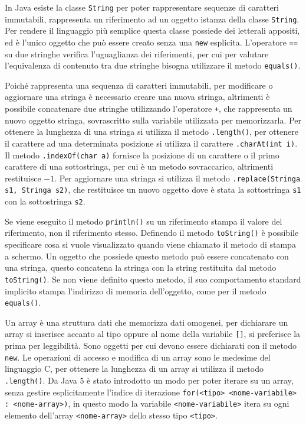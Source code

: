 \documentclass{article}
\numberwithin{equation}{subsection}
\begin{document}
In Java esiste la classe \verb|String| per poter rappresentare sequenze di caratteri immutabili, rappresenta un riferimento ad un oggetto istanza della classe \verb|String|. 
Per rendere il linguaggio più semplice questa classe possiede dei letterali appositi, ed è l'unico oggetto che può essere creato senza una \verb|new| esplicita. L'operatore 
\verb|==| su due stringhe verifica l'uguaglianza dei riferimenti, per cui per valutare l'equivalenza di contenuto tra due stringhe bisogna utilizzare il metodo \verb|equals()|. 

Poiché rappresenta una sequenza di caratteri immutabili, per modificare o aggiornare una stringa è necessario creare una nuova stringa, altrimenti è possibile concatenare due 
stringhe utilizzando l'operatore \verb|+|, che rappresenta un nuovo oggetto stringa, sovrascritto sulla variabile utilizzata per memorizzarla. 
Per ottenere la lunghezza di una stringa si utilizza il metodo \verb|.length()|, per ottenere il carattere ad una determinata posizione si utilizza il carattere \verb|.charAt(int i)|. 
Il metodo \verb|.indexOf(char a)| fornisce la posizione di un carattere o il primo carattere di una sottostringa, per cui è un metodo sovraccarico, altrimenti restituisce $-1$. 
Per aggiornare una stringa si utilizza il metodo \verb|.replace(Stringa s1, Stringa s2)|, che restituisce un nuovo oggetto dove è stata la sottostringa \verb|s1| con la 
sottostringa \verb|s2|.  



Se viene eseguito il metodo \verb|println()| su un riferimento stampa il valore del riferimento, non il riferimento stesso. Definendo il metodo \verb|toString()| è possibile 
specificare cosa si vuole visualizzato quando viene chiamato il metodo di stampa a schermo. Un oggetto che possiede questo metodo può essere concatenato con una stringa, 
questo concatena la stringa con la string restituita dal metodo \verb|toString()|. 
Se non viene definito questo metodo, il suo comportamento standard implicito stampa l'indirizzo di memoria dell'oggetto, come per il metodo \verb|equals()|. 



Un array è una struttura dati che memorizza dati omogenei, per dichiarare un array si inserisce accanto al tipo oppure al nome della variabile \verb|[]|, si preferisce la prima 
per leggibilità. Sono oggetti per cui devono essere dichiarati con il metodo \verb|new|. Le operazioni di accesso e modifica di un array sono le medesime del linguaggio C, 
per ottenere la lunghezza di un array si utilizza il metodo \verb|.length()|. Da Java 5 è stato introdotto un modo per poter iterare su un array, senza gestire 
esplicitamente l'indice di iterazione \verb|for(<tipo> <nome-variabile> : <nome-array>)|, in questo modo la variabile \verb|<nome-variabile>| itera su ogni elemento dell'array 
\verb|<nome-array>| dello stesso tipo \verb|<tipo>|. 
\end{document}
